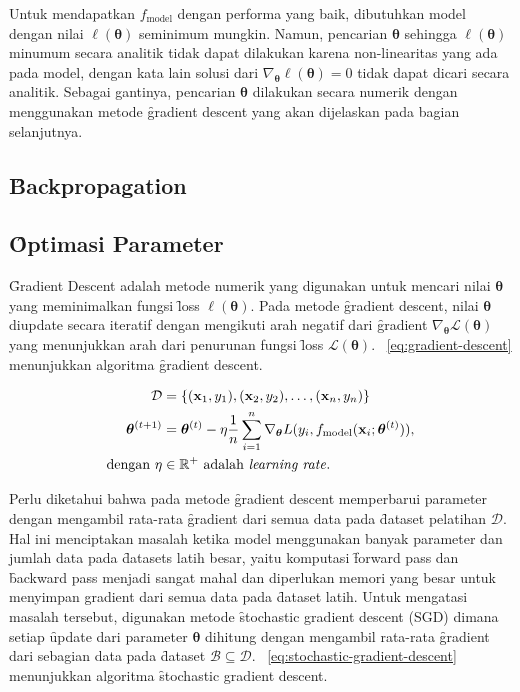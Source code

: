     Untuk mendapatkan $f_\text{model}$ dengan performa yang baik, dibutuhkan model dengan nilai $\ell(\bm{\theta})$ seminimum mungkin. Namun, pencarian $\bm{\theta}$ sehingga $ \ell (\bm{\theta})$ minumum secara analitik tidak dapat dilakukan karena non-linearitas yang ada pada model, dengan kata lain solusi dari $\nabla_{\bm{\theta}} \ell(\bm{\theta}) = 0$ tidak dapat dicari secara analitik. Sebagai gantinya, pencarian $\bm{\theta}$ dilakukan secara numerik dengan menggunakan metode \f{gradient descent} yang akan dijelaskan pada bagian selanjutnya.
    
    \subsection{\f{Backpropagation}}

    \subsection{\f{Optimasi} Parameter}

    \f{Gradient Descent} adalah metode numerik yang digunakan untuk mencari nilai $\bm{\theta}$ yang meminimalkan fungsi \f{loss} $\ell(\bm{\theta})$. Pada metode \f{gradient descent}, nilai $\bm{\theta}$ diupdate secara iteratif dengan mengikuti arah negatif dari \f{gradient} $\nabla_{\bm{\theta}} \mathcal{L}(\bm{\theta})$ yang menunjukkan arah dari penurunan fungsi \f{loss} $\mathcal{L}(\bm{\theta})$. \equ~\ref{eq:gradient-descent} menunjukkan algoritma \f{gradient descent}.

    \begin{align}
        \mathcal{D} &= \{(\mathbf{x}_1, y_1), (\mathbf{x}_2, y_2), \dots, (\mathbf{x}_n, y_n)\} \\
        \label{eq:gradient-descent}
        \bm{\theta}^{(t+1)} &= \bm{\theta}^{(t)} - \eta \frac{1}{n} \sum_{i=1}^{n} \nabla_{\bm{\theta}} L(y_i, f_{\text{model}}(\mathbf{x}_i; \bm{\theta}^{(t)})), \\
        \text{dengan } \eta &\in \mathbb{R}^+ \text{ adalah \textit{learning rate}}.
    \end{align}

    Perlu diketahui bahwa pada metode \f{gradient descent} memperbarui parameter dengan mengambil rata-rata \f{gradient} dari semua data pada \f{dataset} pelatihan $\mathcal{D}$. Hal ini menciptakan masalah ketika model menggunakan banyak parameter dan jumlah data pada \f{datasets} latih besar, yaitu komputasi \f{forward pass} dan \f{backward pass} menjadi sangat mahal dan diperlukan memori yang besar untuk menyimpan gradient dari semua data pada \f{dataset} latih. Untuk mengatasi masalah tersebut, digunakan metode \f{stochastic gradient descent} (SGD) dimana setiap \f{update} dari parameter $\bm{\theta}$ dihitung dengan mengambil rata-rata \f{gradient} dari sebagian data pada \f{dataset} $\mathcal{B}\subseteq\mathcal{D}$. \equ~\ref{eq:stochastic-gradient-descent} menunjukkan algoritma \f{stochastic gradient descent}.


